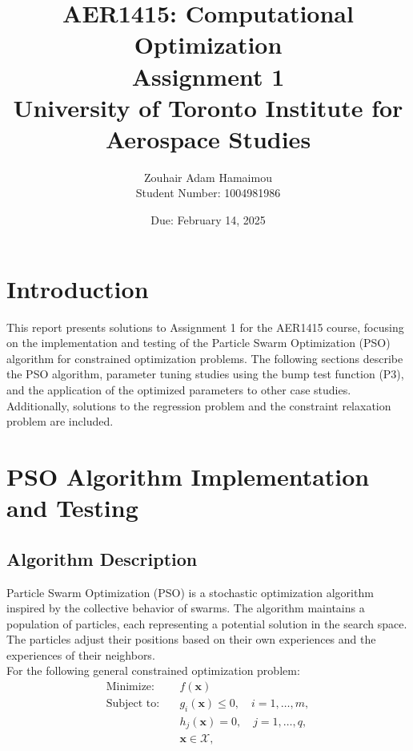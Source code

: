 \documentclass[12pt]{article}
\title{AER1415: Computational Optimization\\Assignment 1\\\vspace{0.4cm}\large \textbf{University of Toronto Institute for Aerospace Studies}}
\author{Zouhair Adam Hamaimou\\Student Number: 1004981986}
\date{Due: February 14, 2025}
\begin{document}
\maketitle

\tableofcontents
\newpage

\section{Introduction}
This report presents solutions to Assignment 1 for the AER1415 course, focusing on the implementation and testing of the Particle Swarm Optimization (PSO) algorithm for constrained optimization problems. The following sections describe the PSO algorithm, parameter tuning studies using the bump test function (P3), and the application of the optimized parameters to other case studies. Additionally, solutions to the regression problem and the constraint relaxation problem are included.

\section{PSO Algorithm Implementation and Testing}

\subsection{Algorithm Description}
Particle Swarm Optimization (PSO) is a stochastic optimization algorithm inspired by the collective behavior of swarms. The algorithm maintains a population of particles, each representing a potential solution in the search space. The particles adjust their positions based on their own experiences and the experiences of their neighbors.
\\
For the following general constrained optimization problem:
\begin{equation}
    \begin{aligned}
        \text{Minimize:} \quad & f(\mathbf{x}) \\
        \text{Subject to:} \quad & g_i(\mathbf{x})  \leq 0, \quad i = 1, \dots, m, \\
        & h_j(\mathbf{x})  = 0, \quad j = 1, \dots, q, \\
        & \mathbf{x}  \in \mathcal{X},
    \end{aligned}
\end{equation}
\end{document}
